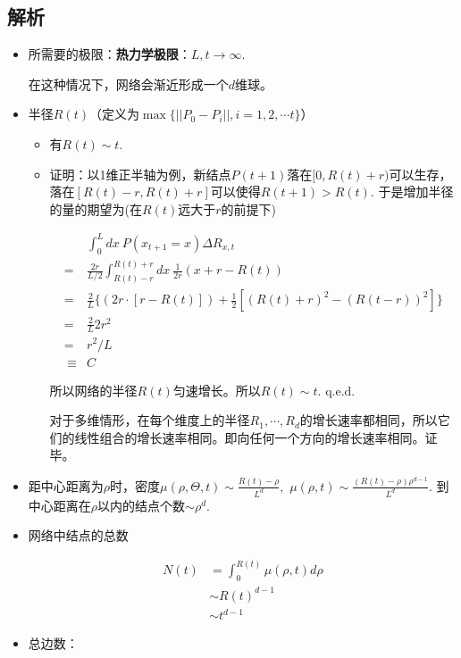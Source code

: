 \subsection{解析}
\begin{itemize}
\item
  所需要的极限：\textbf{热力学极限}：\(L,t\rightarrow\infty.\)

  在这种情况下，网络会渐近形成一个\(d\)维球。
\item
  半径\(R(t)\)（定义为\(\max\{||P_0-P_i||,i=1,2,\cdots t\}\)）

  \begin{itemize}
  \item
    有\(R(t)\sim t.\)
  \item
    证明：以1维正半轴为例，新结点\(P(t+1)\)落在\([0,R(t)+r)\)可以生存，落在\([R(t)-r,R(t)+r]\)可以使得\(R(t+1)> R(t).\)
    于是增加半径的量的期望为(在\(R(t)\)远大于\(r\)的前提下)

    \begin{align}
    &\int_0^Ldx\ P(x_{t+1}=x)\Delta R_{x,t}\\
    =& \frac{2r}{L/2}\int_{R(t)-r}^{R(t)+r} dx\ \frac{1}{2r} (x+r-R(t))\\
    =& \frac{2}{L} \{(2r\cdot [r-R(t)]) +\frac{1}{2}[(R(t)+r)^2-(R(t-r))^2] \}\\
    =& \frac{2}{L} 2r^2\\
    =&r^2/L\\\
    \equiv& C 
    \end{align}

    所以网络的半径\(R(t)\)匀速增长。所以\(R(t)\sim t. \)
    \(\text{q.e.d.}\)

    对于多维情形，在每个维度上的半径\(R_1,\cdots,R_d\)的增长速率都相同，所以它们的线性组合的增长速率相同。即向任何一个方向的增长速率相同。证毕。
  \end{itemize}
\item
  距中心距离为\(\rho\)时，密度\(\mu(\rho,\Theta ,t)\sim \frac{R(t)-\rho}{L^d},\)
  \(\mu(\rho,t) \sim \frac{(R(t)-\rho)\rho^{d-1}}{L^d}. \)
  到中心距离在\(\rho\)以内的结点个数\(\sim \rho^d.\)
\item
  网络中结点的总数

  \begin{align}
  N(t)&=\int_0^{R(t)}\mu(\rho,t)d\rho\\
  &\sim R(t)^{d-1}\\
  &\sim t^{d-1}
  \end{align}
\item
  总边数：


\end{itemize}
